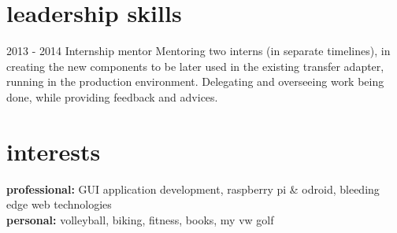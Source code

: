 \documentclass[]{friggeri-cv} %
\begin{document}


\section{leadership skills}

\begin{entrylist}
\entry
{2013 - 2014}
{Internship mentor}
{}
{Mentoring two interns (in separate timelines), in creating the new components to be later used in the existing transfer adapter, running in the production environment. Delegating and overseeing work being done, while providing feedback and advices.}

\end{entrylist}



\section{interests}

\textbf{professional:} GUI application development, raspberry pi \& odroid, bleeding edge web technologies
\\
\textbf{personal:} volleyball, biking, fitness, books, my vw golf

\end{document}
